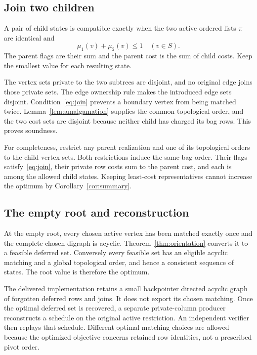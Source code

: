 \documentclass[11pt]{article}
\theoremstyle{definition}\newtheorem{definition}[theorem]{Definition}
\theoremstyle{remark}\newtheorem{remark}[theorem]{Remark}
\begin{document}
\subsection{Join two children}
A pair of child states is compatible exactly when the two active ordered lists $\pi$ are identical and
\begin{equation}
 \mu_1(v)+\mu_2(v)\le1\quad(v\in S).
 \label{eq:join}
\end{equation}
The parent flags are their sum and the parent cost is the sum of child costs. Keep the smallest value for each resulting state.

The vertex sets private to the two subtrees are disjoint, and no original edge joins those private sets. The edge ownership rule makes the introduced edge sets disjoint. Condition~\eqref{eq:join} prevents a boundary vertex from being matched twice. Lemma~\ref{lem:amalgamation} supplies the common topological order, and the two cost sets are disjoint because neither child has charged its bag rows. This proves soundness.

For completeness, restrict any parent realization and one of its topological orders to the child vertex sets. Both restrictions induce the same bag order. Their flags satisfy~\eqref{eq:join}, their private row costs sum to the parent cost, and each is among the allowed child states. Keeping least-cost representatives cannot increase the optimum by Corollary~\ref{cor:summary}.

\subsection{The empty root and reconstruction}
At the empty root, every chosen active vertex has been matched exactly once and the complete chosen digraph is acyclic. Theorem~\ref{thm:orientation} converts it to a feasible deferred set. Conversely every feasible set has an eligible acyclic matching and a global topological order, and hence a consistent sequence of states. The root value is therefore the optimum.

The delivered implementation retains a small backpointer directed acyclic graph of forgotten deferred rows and joins. It does not export its chosen matching. Once the optimal deferred set is recovered, a separate private-column producer reconstructs a schedule on the original active restriction. An independent verifier then replays that schedule. Different optimal matching choices are allowed because the optimized objective concerns retained row identities, not a prescribed pivot order.
\end{document}
